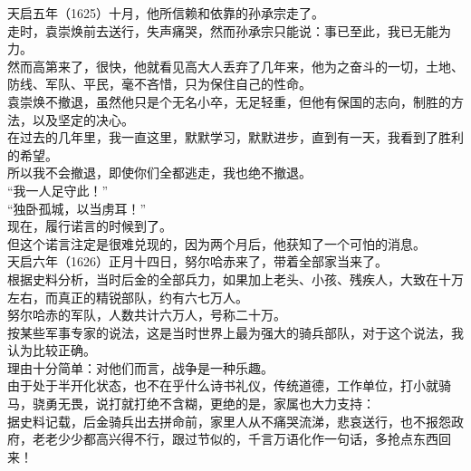 \begin{multicols}{\theparacolNo}
天启五年（1625）十月，他所信赖和依靠的孙承宗走了。\\

走时，袁崇焕前去送行，失声痛哭，然而孙承宗只能说：事已至此，我已无能为力。\\

然而高第来了，很快，他就看见高大人丢弃了几年来，他为之奋斗的一切，土地、防线、军队、平民，毫不吝惜，只为保住自己的性命。\\

袁崇焕不撤退，虽然他只是个无名小卒，无足轻重，但他有保国的志向，制胜的方法，以及坚定的决心。\\

在过去的几年里，我一直这里，默默学习，默默进步，直到有一天，我看到了胜利的希望。\\

所以我不会撤退，即使你们全都逃走，我也绝不撤退。\\

“我一人足守此！”\\

“独卧孤城，以当虏耳！”\\

现在，履行诺言的时候到了。\\

但这个诺言注定是很难兑现的，因为两个月后，他获知了一个可怕的消息。\\

天启六年（1626）正月十四日，努尔哈赤来了，带着全部家当来了。\\

根据史料分析，当时后金的全部兵力，如果加上老头、小孩、残疾人，大致在十万左右，而真正的精锐部队，约有六七万人。\\

努尔哈赤的军队，人数共计六万人，号称二十万。\\

按某些军事专家的说法，这是当时世界上最为强大的骑兵部队，对于这个说法，我认为比较正确。\\

理由十分简单：对他们而言，战争是一种乐趣。\\

由于处于半开化状态，也不在乎什么诗书礼仪，传统道德，工作单位，打小就骑马，骁勇无畏，说打就打绝不含糊，更绝的是，家属也大力支持：\\

据史料记载，后金骑兵出去拼命前，家里人从不痛哭流涕，悲哀送行，也不报怨政府，老老少少都高兴得不行，跟过节似的，千言万语化作一句话，多抢点东西回来！\\


\end{multicols}
